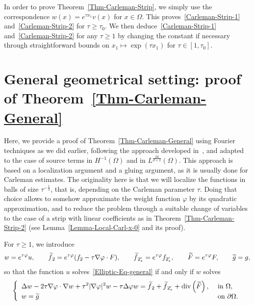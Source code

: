 \documentclass[10pt]{amsart}
\theoremstyle{definition}\newtheorem{defi}[theo]{Definition}\newtheorem{rema}[theo]{Remark}\newtheorem{exam}[theo]{Example}\newtheorem{exem}[theo]{Example}\newtheorem{nota}[theo]{Notation}
\newcommand*\ds{\displaystyle}
\renewcommand{\geq}{\geqslant}
\renewcommand{\tilde}{\widetilde}
\renewcommand{\div}{\operatorname{div}}
\let\oldtilde\tilde
\renewcommand*{\tilde}[1]{\mathchoice{\widetilde{#1}}{\widetilde{#1}}{\oldtilde{#1}}{\oldtilde{#1}}}
\begin{document}
In order to prove Theorem~\ref{Thm-Carleman-Strip}, we simply use the correspondence $w(x) = e^{\tau x_1} v(x)$ for $x \in \Omega$. This proves~\eqref{Carleman-Strip-1} and~\eqref{Carleman-Strip-2} for $\tau \geq \tau_0$. We then deduce~\eqref{Carleman-Strip-1} and~\eqref{Carleman-Strip-2} for any $\tau \geq 1$ by changing the constant if necessary through straightforward bounds on $x_1 \mapsto \exp(\tau x_1) $ for $\tau \in [1, \tau_0]$.



\section{General geometrical setting: proof of Theorem~\ref{Thm-Carleman-General}}\label{Sec-Proof-Carl-General}

Here, we provide a proof of Theorem~\ref{Thm-Carleman-General} using Fourier techniques as we did earlier, following the approach developed in~\cite{darde2023short}, and adapted to the case of source terms in $H^{-1}(\Omega)$ and in $L^{\frac{2d}{d+2}}(\Omega)$. This approach is based on a localization argument and a gluing argument, as it is usually done for Carleman estimates. The originality here is that we will localize the functions in balls of size $\tau^{-\frac{1}{3}}$, that is, depending on the Carleman parameter $\tau$. Doing that choice allows to somehow approximate the weight function $\varphi$ by its quadratic approximation, and to reduce the problem through a suitable change of variables to the case of a strip with linear coefficients as in Theorem~\ref{Thm-Carleman-Strip-2} (see Lemma~\ref{Lemma-Local-Carl-x-0} and its proof).

For $\tau \geq 1$, we introduce
\begin{equation*}
w = e^{ \tau \varphi}u,
\qquad
\tilde f_2 = e^{\tau \varphi} (f_2 - \tau \nabla \varphi \cdot F),
\qquad
\tilde f_{2_*'} = e^{\tau \varphi} f_{2_*'},
\qquad
\tilde F = e^{\tau \varphi} F,
\qquad
\tilde g = g,
\end{equation*}
so that the function $u$ solves~\eqref{Elliptic-Eq-general} if and only if $w$ solves
\begin{equation}\label{Eq-Elliptic-w}
\left\{
\begin{array}{ll}
\ds \Delta w - 2\tau \nabla \varphi \cdot \nabla w + \tau^2 |\nabla \varphi|^2 w - \tau \Delta \varphi w = \tilde f_2 + \tilde f_{2_*'} + \div\left(\tilde F\right), &\text{ in } \Omega,
\\
\ds w = \tilde g & \text{ on } \partial \Omega.
\end{array}
\right.
\end{equation}
\end{document}
